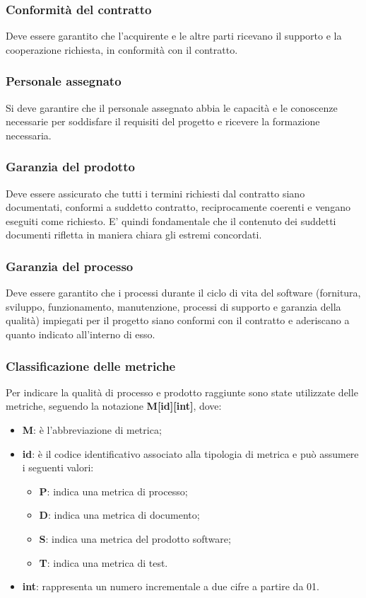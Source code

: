 	\subsubsection{Conformità del contratto}
	Deve essere garantito che l'acquirente e le altre parti ricevano il supporto e la cooperazione richiesta, in conformità con il contratto.
					
	\subsubsection{Personale assegnato}
	Si deve garantire che il personale assegnato abbia le capacità e le conoscenze necessarie per soddisfare il requisiti del progetto e ricevere la formazione necessaria.
					
	\subsubsection{Garanzia del prodotto}
	Deve essere assicurato che tutti i termini richiesti dal contratto siano documentati, conformi a suddetto contratto, reciprocamente coerenti e vengano eseguiti come richiesto. E' quindi fondamentale che il contenuto dei suddetti documenti rifletta in maniera chiara gli estremi concordati.
					
	\subsubsection{Garanzia del processo}
	Deve essere garantito che i processi durante il ciclo di vita del software (fornitura, sviluppo, funzionamento, manutenzione, processi di supporto e garanzia della qualità) impiegati per il progetto siano conformi con il contratto e aderiscano a quanto indicato all'interno di esso.
					
	\subsubsection{Classificazione delle metriche}
	Per indicare la qualità di processo e prodotto raggiunte sono state utilizzate delle metriche, seguendo la notazione \textbf{M[id][int]}, dove:
	\begin{itemize}					
		\item \textbf{M}: è l’abbreviazione di metrica;
		\item \textbf{id}: è il codice identificativo associato alla tipologia di metrica e può assumere i seguenti valori:
		\begin{itemize}
			\item \textbf{P}: indica una metrica di processo;
			\item \textbf{D}: indica una metrica di documento;
			\item \textbf{S}: indica una metrica del prodotto software;
			\item \textbf{T}: indica una metrica di test.
		\end{itemize}
		\item \textbf{int}: rappresenta un numero incrementale a due cifre a partire da 01.
	\end{itemize}